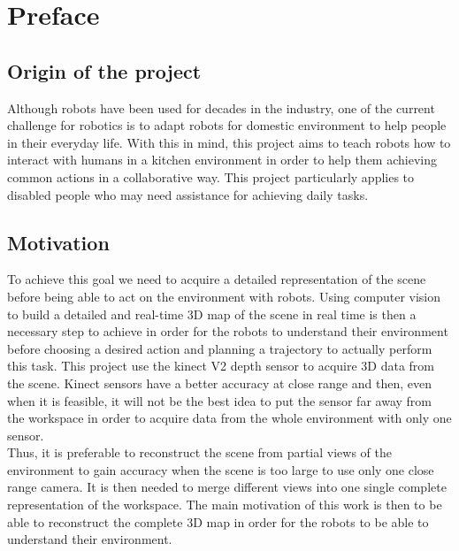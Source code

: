 
\chapter*{Preface}


\section*{Origin of the project}

Although robots have been used for decades in the industry, one of the current challenge for robotics is to adapt robots for domestic environment to help people in their everyday life. With this in mind, this project aims to teach robots how to interact with humans in a kitchen environment in order to help them achieving common actions in a collaborative way. This project particularly applies to disabled people who may need assistance for achieving daily tasks.   

\section*{Motivation}

To achieve this goal we need to acquire a detailed representation of the scene before being able to act on the environment with robots. Using computer vision to build a detailed and real-time 3D map of the scene in real time is then a necessary step to achieve in order for the robots to understand their environment before choosing a desired action and planning a trajectory to actually perform this task. This project use the kinect V2 depth sensor to acquire 3D data from the scene. Kinect sensors have a better accuracy at close range and then, even when it is feasible, it will not be the best idea to put the sensor far away from the workspace in order to acquire data from the whole environment with only one sensor. \\
Thus, it is preferable to reconstruct the scene from partial views of the environment to gain accuracy when the scene is too large to use only one close range camera. It is then needed to merge different views into one single complete representation of the workspace. The main motivation of this work is then to be able to reconstruct the complete 3D map in order for the robots to be able to understand their environment.

